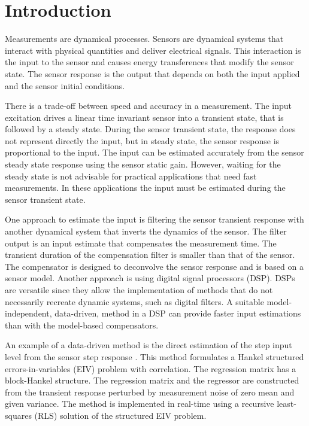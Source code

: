 \chapter{Introduction} \label{chap:Introduction}

Measurements are dynamical processes.
Sensors are dynamical systems that interact with physical quantities and deliver electrical signals.
This interaction is the input to the sensor and causes energy transferences that modify the sensor state.
The sensor response is the output that depends on both the input applied and the sensor initial conditions.

There is a trade-off between speed and accuracy in a measurement.
The input excitation drives a linear time invariant sensor into a transient state, that is followed by a steady state.
During the sensor transient state, the response does not represent directly the input, but 
in steady state, the sensor response is proportional to the input.
The input can be estimated accurately from the sensor steady state response using the sensor static gain.
However, waiting for the steady state is not advisable for practical applications that need fast measurements.
In these applications the input must be estimated during the sensor transient state.

One approach to estimate the input is filtering the sensor transient response with another dynamical system that inverts the dynamics of the sensor.
The filter output is an input estimate that compensates the measurement time.
The transient duration of the compensation filter is smaller than that of the sensor.
The compensator is designed to deconvolve the sensor response and is based on a sensor model.
Another approach is using digital signal processors (DSP).
DSPs are versatile since they allow the implementation of methods that do not necessarily recreate dynamic systems, such as digital filters.
A suitable model-independent, data-driven, method in a DSP can provide faster input estimations than with the model-based compensators.

An example of a data-driven method is the direct estimation of the step input level from the sensor step response \cite{Markovsky15cep}.
This method formulates a Hankel structured errors-in-variables (EIV) problem with correlation.
The regression matrix has a block-Hankel structure.
The regression matrix and the regressor are constructed from the transient response perturbed by measurement noise of zero mean and given variance.
The method is implemented in real-time using a recursive least-squares (RLS) solution of the structured EIV problem.


